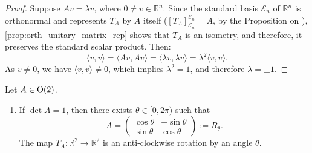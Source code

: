 \begin{proof}
Suppose $Av = \lambda v$, where $0 \neq v \in \mathbb{R}^n$. Since the standard basis $\mathcal{E}_n$ of $\mathbb{R}^n$ is orthonormal and represents $T_A$ by $A$ itself ($[T_A]_{\mathcal{E}_n}^{\mathcal{E}_n} = A$, by the Proposition on ), \cref{prop:orth_unitary_matrix_rep} shows that $T_A$ is an isometry, and therefore, it preserves the standard scalar product. Then:
\[ \langle v, v \rangle = \langle Av, Av \rangle = \langle \lambda v, \lambda v \rangle = \lambda^2 \langle v, v \rangle. \]
As $v \neq 0$, we have $\langle v, v \rangle \neq 0$, which implies $\lambda^2 = 1$, and therefore $\lambda = \pm 1$.
\end{proof}

\begin{proposition}
\label{prop:classification_o2}
Let $A \in \operatorname{O}(2)$.
\begin{enumerate}
    \item If $\det A = 1$, then there exists $\theta \in [0, 2\pi)$ such that 
    \[ A = \begin{pmatrix} \cos\theta & -\sin\theta \\ \sin\theta & \cos\theta \end{pmatrix} := R_\theta. \]
    The map $T_A \colon \mathbb{R}^2 \to \mathbb{R}^2$ is an anti-clockwise rotation by an angle $\theta$.
    

\end{enumerate}
\end{proposition}
